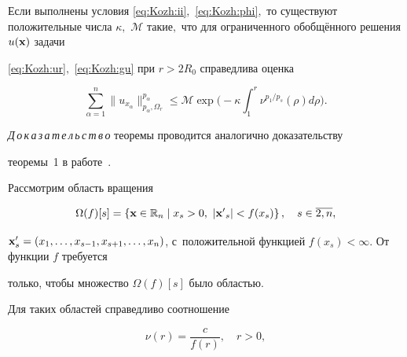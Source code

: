 \smallskip



\begin{theorem}[1]Если выполнены условия \eqref{eq:Kozh:ii}$,$ \eqref{eq:Kozh:phi}$,$ то существуют положительные числа $\kappa,$ $\mathcal{M}$ такие$,$ что для ограниченного обобщённого решения $u({ \bf x})$ задачи

\eqref{eq:Kozh:ur}$,$ \eqref{eq:Kozh:gu} при $r>2R_0$ справедлива оценка

\begin{equation}

\sum\limits_{\alpha=1}^{n}\|u_{x_\alpha}\|^{p_\alpha}_{p_\alpha,\Omega_r}\leq

\mathcal{M} \exp\biggl(-\kappa

\int_1^r\nu^{p_1/p_s}(\rho)d\rho\biggr).\label{eq:Kozh:teorem_1}

\end{equation}

\end{theorem}



\smallskip



\textit{Д\,о\,к\,а\,з\,а\,т\,е\,л\,ь\,с\,т\,в\,о}\/ теоремы проводится аналогично доказательству

теоремы~1 в работе~\cite{KozhKhad:bib:KozhKhad}.



Рассмотрим область вращения

\begin{equation}

\Omega(f)[s]=\left\{{\bf x}\in \mathbb{R}_{n} \mid  x_s>0, \ |{\bf

x'}_s|<f(x_s)\right\},\quad s\in \overline{2,n},\label{eq:Kozh:vra}

\end{equation}

${\bf x}'_s=(x_1,\ldots,x_{s-1},x_{s+1},\ldots,x_n)$, с~положительной функцией $f(x_s)<\infty.$ От функции $f$ требуется

только, чтобы множество $\Omega(f)[s]$ было областью.



Для таких областей справедливо соотношение

\begin{equation}

\nu(r)=\frac{c}{f(r)},\quad r>0,\label{eq:Kozh:nu_2}

\end{equation}

